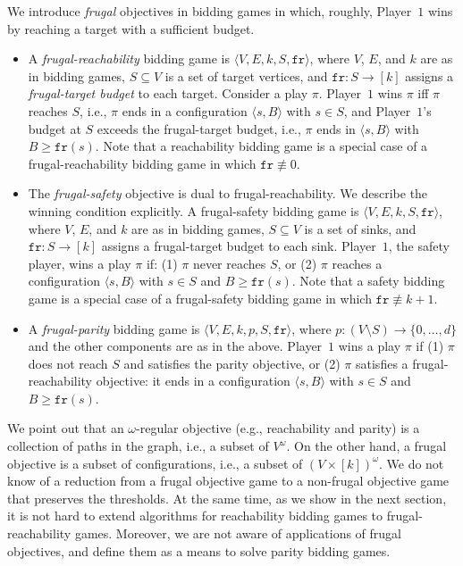 \documentclass{article}\providecommand{\nequiv}{\not\equiv}\usepackage[a4paper,margin=20mm]{geometry}
\newcommand{\PO}{Player~$1$\xspace}
\newcommand{\fr}{\texttt{fr}}
\newcommand{\zug}[1]{\langle #1  \rangle}
\renewcommand{\set}[1]{\{ #1  \}}
\begin{document}
We introduce {\em frugal} objectives in bidding games in which, roughly, \PO wins by reaching a target with a sufficient budget.
\begin{definition}
\mbox{}\newline
\begin{itemize}
\item A {\em frugal-reachability} bidding game is $\zug{V, E, k, S, \fr}$, where $V$, $E$, and $k$ are as in bidding games, $S \subseteq V$ is a set of target vertices, and $\fr:S \rightarrow [k]$ assigns a {\em frugal-target budget} to each target. Consider a play $\pi$. 
 \PO wins $\pi$ iff $\pi$ reaches $S$, i.e., $\pi$ ends in a configuration \(\zug{s, B}\) with \(s \in S\), and \PO's budget at $S$ exceeds the frugal-target budget, i.e., $\pi$ ends in \(\zug{s, B}\) with $B \geq \fr(s)$. Note that a reachability bidding game is a special case of a frugal-reachability bidding game in which $\fr \nequiv 0$. 
\item The {\em frugal-safety} objective is dual to frugal-reachability. We describe the winning condition explicitly. A frugal-safety bidding game is $\zug{V, E, k, S, \fr}$, where $V$, $E$, and $k$ are as in bidding games, $S \subseteq V$ is a set of sinks, and $\fr:S \rightarrow [k]$ assigns a frugal-target budget to each sink. \PO, the safety player, wins a play $\pi$ if: (1) $\pi$ never reaches $S$, or (2) $\pi$ reaches a configuration $\zug{s, B}$ with $s \in S$ and $B \geq \fr(s)$. Note that a safety bidding game is a special case of a frugal-safety bidding game in which $\fr \nequiv k+1$. 
\item A {\em frugal-parity} bidding game is $\zug{V, E, k, p, S, \fr}$, where $p: (V \setminus S) \rightarrow \set{0,\ldots, d}$ and the other components are as in the above. \PO wins a play $\pi$ if (1) $\pi$ does not reach $S$ and satisfies the parity objective, or (2) $\pi$ satisfies a frugal-reachability objective: it ends in a configuration $\zug{s, B}$ with $s \in S$ and $B \geq \fr(s)$.
\end{itemize}
\end{definition}

\begin{remark}
We point out that an $\omega$-regular objective (e.g., reachability and parity) is a collection of paths in the graph, i.e., a subset of $V^\omega$. On the other hand, a frugal objective is a subset of configurations, i.e., a subset of $(V \times [k])^\omega$. We do not know of a reduction from a frugal objective game to a non-frugal objective game that preserves the thresholds. At the same time, as we show in the next section, it is not hard to extend algorithms for reachability bidding games to frugal-reachability games. Moreover, we are not aware of applications of frugal objectives, and define them as a means to solve parity bidding games. 
\end{remark}
\end{document}
